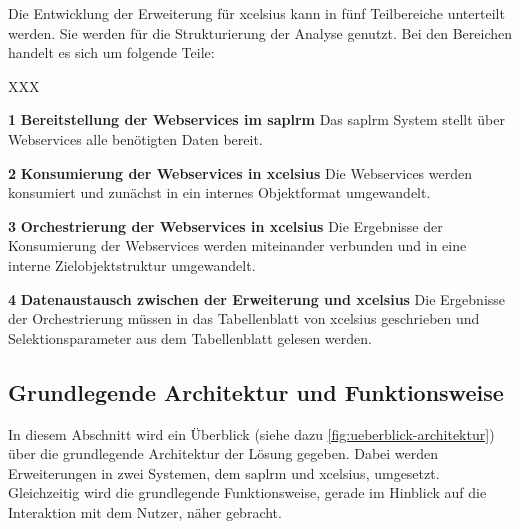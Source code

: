 \begin{onehalfspacing}
Die Entwicklung der Erweiterung für \gls{xcelsius} kann in fünf Teilbereiche unterteilt werden. Sie werden für die Strukturierung der Analyse genutzt. Bei den Bereichen handelt es sich um folgende Teile:


\begin{seToplist} { XXX }
\item[ \textbf{1}] \textbf{Bereitstellung der Webservices im \gls{saplrm}} \newline
Das \gls{saplrm} System stellt über Webservices alle benötigten Daten bereit.

\item[ \textbf{2}] \textbf{Konsumierung der Webservices in \gls{xcelsius}} \newline
Die Webservices werden konsumiert und zunächst in ein internes Objektformat umgewandelt.

\item[ \textbf{3}] \textbf{Orchestrierung der Webservices in \gls{xcelsius}} \newline
Die Ergebnisse der Konsumierung der Webservices werden miteinander verbunden und in eine interne Zielobjektstruktur umgewandelt.

\item[ \textbf{4}] \textbf{Datenaustausch zwischen der Erweiterung und \gls{xcelsius}} \newline
Die Ergebnisse der Orchestrierung müssen in das Tabellenblatt von \gls{xcelsius} geschrieben und Selektionsparameter aus dem Tabellenblatt gelesen werden.

\end{seToplist}

\subsection{Grundlegende Architektur und Funktionsweise}
In diesem Abschnitt wird ein Überblick (siehe dazu \vref{fig:ueberblick-architektur}) über die grundlegende Architektur der Lösung gegeben. Dabei werden Erweiterungen in zwei Systemen, dem \gls{saplrm} und \gls{xcelsius}, umgesetzt. Gleichzeitig wird die grundlegende Funktionsweise, gerade im Hinblick auf die Interaktion mit dem Nutzer, näher gebracht.


\end{onehalfspacing}
